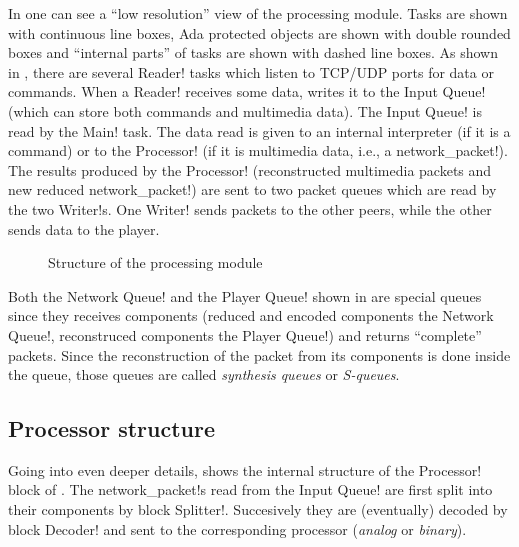 \documentclass{medusabook}
\begin{document}
In  one can see a ``low resolution'' view of the
processing module. Tasks are shown with continuous line boxes, Ada
protected objects are shown with double rounded boxes and ``internal
parts'' of tasks are shown with dashed line boxes.  As shown in
, there are several \ttt Reader! tasks which listen to
TCP/UDP ports for data or commands.  When a \ttt Reader! receives some
data, writes it to the \ttt Input Queue! (which can store both
commands and multimedia data).  The \ttt Input Queue! is read by the \ttt Main!
task.  The data read is given to an internal interpreter (if it is a
command) or to the \ttt Processor! (if it is multimedia data, i.e., a
\ttt network\_packet!).  The results produced by the \ttt Processor!
(reconstructed multimedia packets and new reduced \ttt
network\_packet!) are sent to two packet queues which are read by the
two \ttt Writer!s.  One \ttt Writer! sends packets to the other peers,
while the other sends data to the player.

\begin{figure}
\centerline{}
\caption{Structure of the processing module
\label{fig:structure}}
\end{figure}
%
Both the \ttt Network Queue! and the \ttt Player Queue! shown in
 are special queues since they receives components
(reduced and encoded components the \ttt Network Queue!, reconstruced
components the \ttt Player Queue!) and returns ``complete'' packets.
Since the reconstruction of the packet from its components is done
inside the queue, those queues are called \emph{synthesis queues} or
\emph{S-queues}. 

\subsection{Processor structure}
\label{sub:0.1.1;dsp_book}

Going into even deeper details,  shows the
internal structure of the \ttt Processor! block of .
The \ttt network\_packet!s read from the \ttt Input Queue! are first
split into their components by block \ttt Splitter!.  Succesively they
are (eventually) decoded by block \ttt Decoder! and sent to the
corresponding processor (\emph{analog} or \emph{binary}). 
\end{document}
